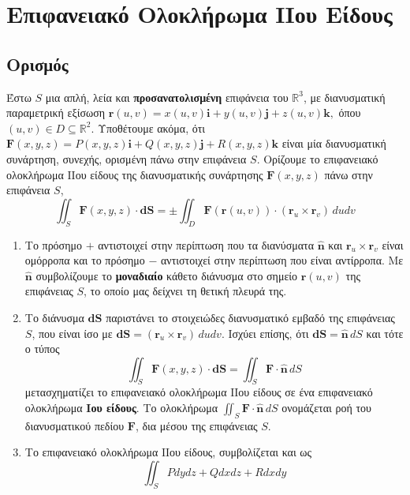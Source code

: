 \documentclass[a4paper,table]{report}
\begin{document}
\chapter*{Επιφανειακό Ολοκλήρωμα ΙΙου Είδους}

\setcounter{chapter}{1}

\section{Ορισμός}

Έστω $ S $ μια απλή, λεία και \textbf{προσανατολισμένη} επιφάνεια του 
$ \mathbb{R}^{3} $, με διανυσματική παραμετρική εξίσωση $ \mathbf{r}(u,v) =
x(u,v)\mathbf{i}+y(u,v)\mathbf{j}+z(u,v)\mathbf{k}, $ όπου $ (u,v) \in D \subseteq
\mathbb{R}^{2} $. Υποθέτουμε ακόμα, ότι $ \mathbf{F}(x,y,z) =
P(x,y,z)\mathbf{i}+Q(x,y,z)\mathbf{j}+R(x,y,z)\mathbf{k} $ είναι μία διανυσματική 
συνάρτηση, συνεχής, ορισμένη πάνω στην επιφάνεια $S$. Ορίζουμε το 
\textcolor{Col1}{επιφανειακό ολοκλήρωμα ΙΙου είδους} της διανυσματικής συνάρτησης 
$ \mathbf{F}(x,y,z) $ πάνω στην επιφάνεια $S$,
\[
  \iint_{S} \mathbf{F}(x,y,z) \cdot \mathbf{dS}  = \pm \iint_{D} 
  \mathbf{F}(\mathbf{r}(u,v)) \cdot (\mathbf{r}_{u} \times \mathbf{r}_{v}) \, dudv   
\]

\begin{rems}
\item {}
  \begin{enumerate}
    \item Το πρόσημο $ + $ αντιστοιχεί στην περίπτωση που τα διανύσματα 
      $ \mathbf{\widehat{n}} $ και $ \mathbf{r}_{u} \times \mathbf{r}_{v} $ 
      είναι ομόρροπα και το πρόσημο $ - $ αντιστοιχεί στην περίπτωση που είναι 
      αντίρροπα. Με $ \mathbf{\widehat{n}} $ συμβολίζουμε το \textbf{μοναδιαίο} κάθετο 
      διάνυσμα στο σημείο $ \mathbf{r}(u,v) $ της επιφάνειας $S$, το οποίο μας δείχνει 
      τη θετική πλευρά της.
    \item Το διάνυσμα $ \mathbf{dS} $ παριστάνει το στοιχειώδες διανυσματικό εμβαδό 
      της επιφάνειας $S$, που είναι ίσο με $ \mathbf{dS} = (\mathbf{r}_{u} \times
      \mathbf{r}_{v})\, du dv $. Ισχύει επίσης, ότι $ \mathbf{dS} = \mathbf{\widehat{n}}
      \,dS $ και τότε ο τύπος 
      \begin{equation}\label{eq:flux1}
        \boxed{\iint_{S} \mathbf{F}(x,y,z) \cdot \mathbf{dS} = \iint_{S} \mathbf{F} \cdot
        \mathbf{\widehat{n}} \,{dS}}
      \end{equation} 
      μετασχηματίζει το επιφανειακό ολοκλήρωμα ΙΙου είδους σε ένα επιφανειακό 
      ολοκλήρωμα \textbf{Ιου είδους}. Το ολοκλήρωμα $ \iint_{S} \mathbf{F}\cdot
      \mathbf{\widehat{n}} \,{dS} $ ονομάζεται \textcolor{Col1}{ροή} του 
      διανυσματικού πεδίου $ \mathbf{F} $, \textcolor{Col1}{δια μέσου} της επιφάνειας 
      $S$.
    \item Το επιφανειακό ολοκλήρωμα ΙΙου είδους, συμβολίζεται και ως 
      \[
        \iint_{S} Pdydz + Qdxdz + Rdxdy 
      \] 
  \end{enumerate}
\end{rems} 
\end{document}
